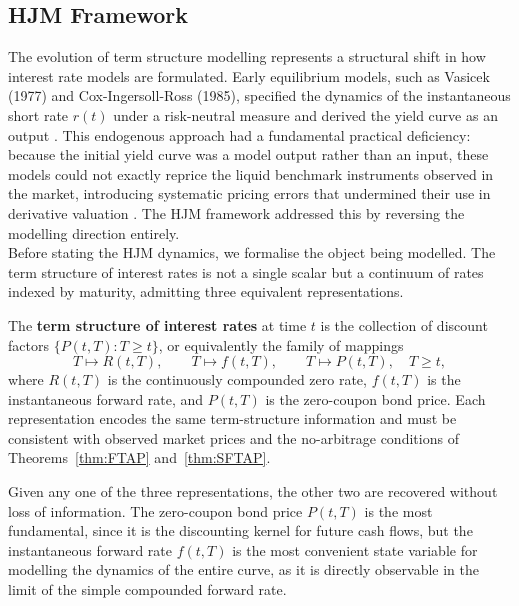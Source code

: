     \subsection*{HJM Framework}
    \noindent
    The evolution of term structure modelling represents a structural shift in how interest rate models are formulated. Early equilibrium models, such as Vasicek (1977) and Cox-Ingersoll-Ross (1985), specified the dynamics of the instantaneous short rate $r(t)$ under a risk-neutral measure and derived the yield curve as an output \cite{Green_2016}. This endogenous approach had a fundamental practical deficiency: because the initial yield curve was a model output rather than an input, these models could not exactly reprice the liquid benchmark instruments observed in the market, introducing systematic pricing errors that undermined their use in derivative valuation \cite{oosterlee2019mathematical}. The HJM framework addressed this by reversing the modelling direction entirely. \\

    \noindent
    Before stating the HJM dynamics, we formalise the object being modelled. The term structure of interest rates is not a single scalar but a continuum of rates indexed by maturity, admitting three equivalent representations.

    \begin{definition}\label{def:term_structure}
    The \textbf{term structure of interest rates} at time $t$ is the collection of discount factors $\{P(t,T) : T \geq t\}$, or equivalently the family of mappings
    \begin{equation}
        T \mapsto R(t,T), \qquad T \mapsto f(t,T), \qquad T \mapsto P(t,T), \quad T \geq t,
    \end{equation}
    where $R(t,T)$ is the continuously compounded zero rate, $f(t,T)$ is the instantaneous forward rate, and $P(t,T)$ is the zero-coupon bond price. Each representation encodes the same term-structure information and must be consistent with observed market prices and the no-arbitrage conditions of Theorems~\ref{thm:FTAP} and~\ref{thm:SFTAP}.
    \end{definition}

    \noindent
    Given any one of the three representations, the other two are recovered without loss of information. The zero-coupon bond price $P(t,T)$ is the most fundamental, since it is the discounting kernel for future cash flows, but the instantaneous forward rate $f(t,T)$ is the most convenient state variable for modelling the dynamics of the entire curve, as it is directly observable in the limit of the simple compounded forward rate. \\

